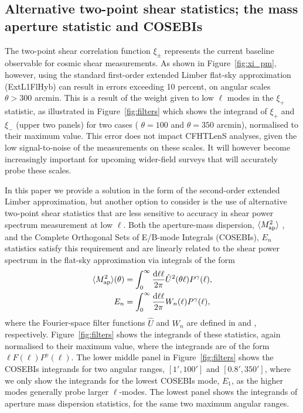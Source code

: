 \subsection{Alternative two-point shear statistics; the mass aperture statistic
and COSEBIs}

The two-point shear correlation function $\xi_\pm$ represents the current
baseline observable for cosmic shear measurements.   As shown in
Figure~\ref{fig:xi_pm}, however, using the standard first-order extended
Limber flat-sky approximation (ExtL1FlHyb) can result in errors exceeding 10
percent, on angular scales $\theta > 300$ arcmin.    This is a result of the
weight given to low $\ell$ modes in the $\xi_+$ statistic, as
illustrated in Figure~\ref{fig:filters} which shows the integrand of $\xi_+$
and $\xi_-$ (upper two panels) for two cases ( $\theta = 100$ and $\theta =
350$ arcmin), normalised to their maximum value.   This error does not impact
CFHTLenS analyses, given the low signal-to-noise of the measurements on these
scales.  It will however become increasingly important for upcoming wider-field
surveys that will accurately probe these scales.

In this paper we provide a solution in the form of the second-order extended
Limber approximation, but another option to consider is the use of alternative two-point
shear statistics that are less sensitive to accuracy in shear power spectrum
measurement at low $\ell$.   Both the aperture-mass dispersion, $\langle M_
{\rm ap}^2 \rangle$ \citep{1998MNRAS.296..873S}, and the Complete Orthogonal
Sets of E/B-mode Integrals (COSEBIs), $E_n$ \citep{COSEBIs} statistics satisfy
this requirement and are linearly related to the shear power spectrum in the
flat-sky approximation via integrals of the form 
%
\begin{align}
  \langle M_ {\rm ap}^2 \rangle(\theta) & = \int_0^{\infty}\frac{{\rm d} \ell \ell}{2\pi}
  \hat U^2(\theta\ell) P^\gamma(\ell),
  \label{eqn:integ}
  \\
  E_n & = \int_0^{\infty}\frac{{\rm d} \ell \ell}{2\pi} W_n(\ell) P^\gamma(\ell),
\end{align}
%
where the Fourier-space filter functions $\hat U$ and $W_n$ are defined in
\cite{1998MNRAS.296..873S} and \cite{COSEBIs}, respectively.
Figure~\ref{fig:filters} shows the integrands of these statistics, again
normalised to their maximum value, where the integrands are of the form $\ell
F(\ell) P^\gamma(\ell)$.  The lower middle panel in Figure~\ref{fig:filters}
shows the COSEBIs integrands for two angular ranges, $[1',100']$ and
$[0.8',350']$, where we only show the integrands for the lowest COSEBIs mode,
$E_1$, as the higher modes generally probe larger $\ell$-modes.  The lowest
panel shows the integrands of aperture mass dispersion statistics, for the same
two maximum angular ranges. 

